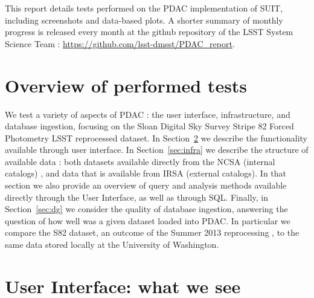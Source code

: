 \documentclass[DM,lsstdraft,toc]{lsstdoc}
\begin{document}
This report details tests performed on the PDAC implementation of SUIT, including screenshots and data-based plots.  A shorter summary of monthly progress is released every month at the github repository of the LSST System Science Team : \url{https://github.com/lsst-dmsst/PDAC_report}.




\section{Overview of performed tests}

We test a variety of aspects of PDAC : the user interface, infrastructure, and database ingestion, focusing on the Sloan Digital Sky Survey Stripe 82 Forced Photometry LSST reprocessed dataset. In Section~\ref{sec:ui} we describe the functionality available through user interface. In Section~\ref{sec:infra} we describe the structure of  available data : both datasets available directly from the NCSA (internal catalogs) , and data that is available from IRSA (external catalogs).  In that section we also provide an overview of query and analysis methods available directly through the User Interface,  as well as through SQL.  Finally, in Section~\ref{sec:dg} we consider the quality of database ingestion, answering the question of how well was a given dataset loaded into PDAC. In particular we compare the S82 dataset, an outcome of the Summer 2013 reprocessing , to the same data stored locally at the University of Washington.



\section{User Interface: what we see}
\label{sec:ui}
\end{document}
